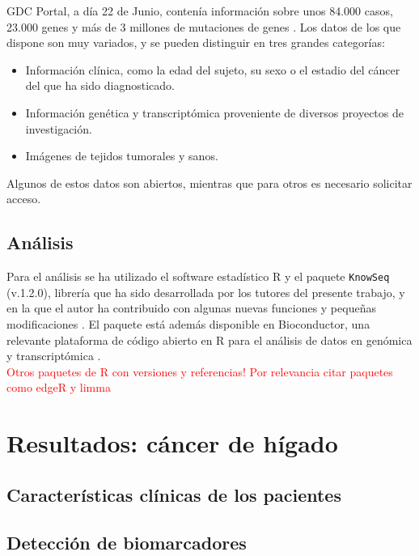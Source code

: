 GDC Portal, a día 22 de Junio, contenía información sobre unos 84.000 casos, 23.000 genes y más de 3 millones de mutaciones de genes \cite{GDCPortal}. Los datos de los que dispone son muy variados, y se pueden distinguir en tres grandes categorías:

\begin{itemize}
	\item Información clínica, como la edad del sujeto, su sexo o el estadio del cáncer del que ha sido diagnosticado.
	\item Información genética y transcriptómica proveniente de diversos proyectos de investigación.
	\item Imágenes de tejidos tumorales y sanos.
\end{itemize} 

Algunos de estos datos son abiertos, mientras que para otros es necesario solicitar acceso.

\subsection{Análisis}

Para el análisis se ha utilizado el software estadístico R \cite{R} y el paquete \texttt{KnowSeq} (v.1.2.0), librería que ha sido desarrollada por los tutores del presente trabajo, y en la que el autor ha contribuido con algunas nuevas funciones y pequeñas modificaciones \cite{KnowSeq}. El paquete está además disponible en Bioconductor, una relevante plataforma de código abierto en R para el análisis de datos en genómica y transcriptómica \cite{Gentleman2004}.\\

\textcolor{red}{Otros paquetes de R con versiones y referencias! Por relevancia citar paquetes como edgeR y limma}

\section{Resultados: cáncer de hígado}

\subsection{Características clínicas de los pacientes}

\subsection{Detección de biomarcadores}

